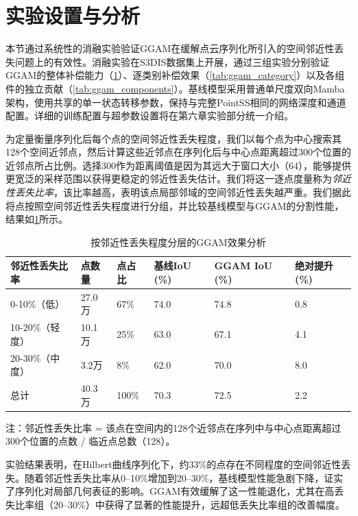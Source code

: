 \documentclass[12pt,a4paper,openany,oneside]{ctexbook}
\theoremstyle{definition}
\theoremstyle{remark}
\begin{document}
\section{实验设置与分析}
本节通过系统性的消融实验验证GGAM在缓解点云序列化所引入的空间邻近性丢失问题上的有效性。消融实验在S3DIS数据集上开展，通过三组实验分别验证GGAM的整体补偿能力（\cref{tab:ggam_fragmentation}）、逐类别补偿效果（\cref{tab:ggam_category}）以及各组件的独立贡献（\cref{tab:ggam_components}）。基线模型采用普通单尺度双向Mamba架构，使用共享的单一状态转移参数，保持与完整PointSS相同的网络深度和通道配置。详细的训练配置与超参数设置将在第六章实验部分统一介绍。

为定量衡量序列化后每个点的空间邻近性丢失程度，我们以每个点为中心搜索其128个空间近邻点，然后计算这些近邻点在序列化后与中心点距离超过300个位置的近邻点所占比例。选择300作为距离阈值是因为其远大于窗口大小（64），能够提供更宽泛的采样范围以获得更稳定的邻近性丢失估计。我们将这一逐点度量称为\textit{邻近性丢失比率}，该比率越高，表明该点局部邻域的空间邻近性丢失越严重。我们据此将点按照空间邻近性丢失程度进行分组，并比较基线模型与GGAM的分割性能，结果如\cref{tab:ggam_fragmentation}所示。

\begin{table}[htbp!]
	\centering
	\caption{按邻近性丢失程度分层的GGAM效果分析}
	\label{tab:ggam_fragmentation}
	\begin{tabular}{@{}llllll@{}}
		\toprule
		邻近性丢失比率 & 点数量 & 点占比 & 基线IoU (\%) & GGAM IoU (\%) & 绝对提升 (\%) \\
		\midrule
		0-10\%（低） & 27.0万 & 67\% & 74.0 & 74.8 & 0.8 \\
		10-20\%（轻度） & 10.1万 & 25\% & 63.0 & 67.1 & 4.1 \\
		20-30\%（中度） & 3.2万 & 8\% & 62.0 & 70.0 & 8.0 \\
		\midrule
		总计 & 40.3万 & 100\% & 70.3 & 72.5 & 2.2 \\
		\bottomrule
	\end{tabular}
	\par\vspace{3pt}
	\footnotesize 注：邻近性丢失比率 = 该点在空间内的128个近邻点在序列中与中心点距离超过300个位置的点数 / 临近点总数（128）。
\end{table}

实验结果表明，在Hilbert曲线序列化下，约33\%的点存在不同程度的空间邻近性丢失。随着邻近性丢失比率从0--10\%增加到20--30\%，基线模型性能急剧下降，证实了序列化对局部几何表征的影响。GGAM有效缓解了这一性能退化，尤其在高丢失比率组（20--30\%）中获得了显著的性能提升，远超低丢失比率组的改善幅度。
\end{document}
